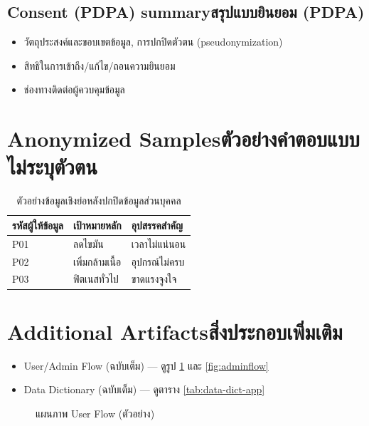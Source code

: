 \subsection{\ifenglish Consent (PDPA) summary\else สรุปแบบยินยอม (PDPA)\fi}
\begin{itemize}
  \item วัตถุประสงค์และขอบเขตข้อมูล, การปกปิดตัวตน (pseudonymization)
  \item สิทธิในการเข้าถึง/แก้ไข/ถอนความยินยอม
  \item ช่องทางติดต่อผู้ควบคุมข้อมูล
\end{itemize}

\section{\ifenglish Anonymized Samples\else ตัวอย่างคำตอบแบบไม่ระบุตัวตน\fi}
\begin{table}[h]
\centering
\begin{tabular}{@{}lll@{}}
\toprule
\textbf{รหัสผู้ให้ข้อมูล} & \textbf{เป้าหมายหลัก} & \textbf{อุปสรรคสำคัญ} \\
\midrule
P01 & ลดไขมัน & เวลาไม่แน่นอน \\
P02 & เพิ่มกล้ามเนื้อ & อุปกรณ์ไม่ครบ \\
P03 & ฟิตเนสทั่วไป & ขาดแรงจูงใจ \\
\bottomrule
\end{tabular}
\caption{ตัวอย่างข้อมูลเชิงย่อหลังปกปิดข้อมูลส่วนบุคคล}
\label{tab:anon-samples}
\end{table}

\section{\ifenglish Additional Artifacts\else สิ่งประกอบเพิ่มเติม\fi}
\begin{itemize}
  \item User/Admin Flow (ฉบับเต็ม) — ดูรูป \ref{fig:userflow} และ \ref{fig:adminflow}
  \item Data Dictionary (ฉบับเต็ม) — ดูตาราง \ref{tab:data-dict-app}
\end{itemize}

\begin{figure}[h]
  \centering
  \caption{แผนภาพ User Flow (ตัวอย่าง)}
  \label{fig:userflow}
\end{figure}

